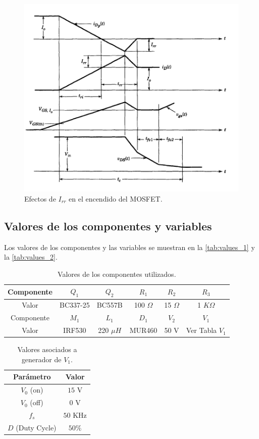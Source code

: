 \documentclass[e4_tp1_main.tex]{subfiles}
\begin{document}
\begin{figure}[H]
  \centering
  \includegraphics[width=\linewidth/2]{images/ej1/diode_irr.png}
  \caption{Efectos de $I_{rr}$ en el encendido del MOSFET.}
  \label{fig:mosfet_irr}
\end{figure}

\subsection{Valores de los componentes y variables}

Los valores de los componentes y las variables se muestran en la \autoref{tab:values_1} y la \autoref{tab:values_2}.

\begin{table}[H]
\centering
\begin{tabular}{|c|c|c|c|c|c|}
\hline
Componente & $Q_1$ & $Q_2$ & $R_1$ & $R_2$ & $R_3$ \\
\hline
Valor & BC337-25 & BC557B & 100 $\Omega$ & 15 $\Omega$ & 1 $K\Omega$ \\
\hline
Componente & $M_1$ & $L_1$ & $D_1$ & $V_2$ & $V_1$\\
\hline
Valor & IRF530 & 220 $\mu H$ & MUR460 & 50 V & Ver Tabla $V_1$\\
\hline
\end{tabular}
\caption{Valores de los componentes utilizados.}
\label{tab:values_1}
\end{table}

\begin{table}[H]
\centering
\begin{tabular}{|c|c|}
\hline
Parámetro & Valor \\
\hline
$V_0$ (on) & $15$ V \\
\hline
$V_0$ (off) & $0$ V \\
\hline
$f_s$ & $50$ KHz \\
\hline
$D$ (Duty Cycle) & $50\%$ \\
\hline
\end{tabular}
\caption{Valores asociados a generador de $V_1$.}
\label{tab:values_2}
\end{table}
\end{document}
